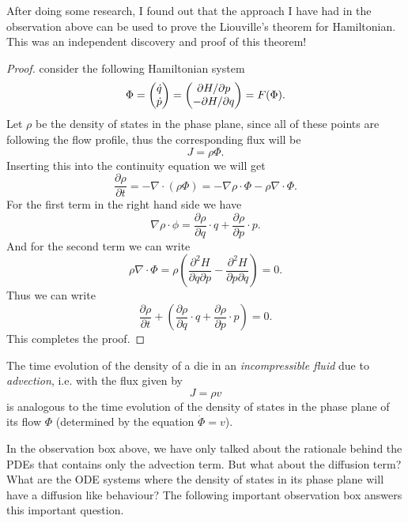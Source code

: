 \begin{observation}
	After doing some research, I found out that the approach I have had in the observation above can be used to prove the Liouville's theorem for Hamiltonian. This was an independent discovery and proof of this theorem! 
	
	\begin{proof}
		consider the following Hamiltonian system
		\[ \Phi = \begin{pmatrix} \dot{q} \\ \dot{p} \end{pmatrix} = \begin{pmatrix} \partial H/ \partial p \\ - \partial H / \partial q \end{pmatrix} = F(\Phi). \]
		Let $ \rho $ be the density of states in the phase plane, since all of these points are following the flow profile, thus the corresponding flux will be
		\[  J = \rho \Phi.  \]
		Inserting this into the continuity equation we will get
		\[ \frac{\partial \rho}{\partial t} = -\nabla\cdot (\rho \Phi) = - \nabla \rho \cdot \Phi - \rho\nabla\cdot\Phi . \]
		For the first term in the right hand side we have
		\[ \nabla\rho\cdot \phi = \frac{\partial \rho}{\partial q}\cdot{q} + \frac{\partial \rho}{\partial p} \cdot{p}. \]
		And for the second term we can write
		\[ \rho\nabla\cdot\Phi = \rho(\frac{\partial^2 H}{\partial q\partial p} - \frac{\partial^2 H}{\partial p \partial q}) = 0. \]
		Thus we can write
		\[ \frac{\partial\rho}{\partial t} + (\frac{\partial \rho}{\partial q}\cdot{q} + \frac{\partial \rho}{\partial p} \cdot{p}) = 0.  \]
		This completes the proof.
	\end{proof}
\end{observation}

\begin{observation}
	The time evolution of the density of a die in an \emph{incompressible fluid} due to \emph{advection}, i.e. with the flux given by
	\[  J=\rho v\]
	 is analogous to the time evolution of the density of states in the phase plane of its flow $ \Phi $ (determined by the equation $ \dot{\Phi}=v $).
\end{observation}

In the observation box above, we have only talked about the rationale behind the PDEs that contains only the advection term. But what about the diffusion term? What are the ODE systems where the density of states in its phase plane will have a diffusion like behaviour? The following important observation box answers this important question.

